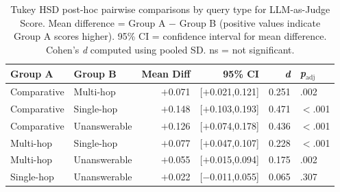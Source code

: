 \begin{table}[h]
\centering
\caption{Tukey HSD post-hoc pairwise comparisons by query type for LLM-as-Judge Score. Mean difference = Group A $-$ Group B (positive values indicate Group A scores higher). 95\% CI = confidence interval for mean difference. Cohen's \textit{d} computed using pooled SD. ns = not significant.}
\label{tab:tukey_querytype}
\begin{tabular}{llrrrl}
\toprule
\textbf{Group A} & \textbf{Group B} & \textbf{Mean Diff} & \textbf{95\% CI} & \textbf{\textit{d}} & \textbf{\textit{p}$_{\text{adj}}$} \\
\midrule
Comparative & Multi-hop    & $+$0.071 & [$+$0.021,\hphantom{$+$}0.121] & 0.251 & .002 \\
Comparative & Single-hop   & $+$0.148 & [$+$0.103,\hphantom{$+$}0.193] & 0.471 & $<$.001 \\
Comparative & Unanswerable & $+$0.126 & [$+$0.074,\hphantom{$+$}0.178] & 0.436 & $<$.001 \\
Multi-hop   & Single-hop   & $+$0.077 & [$+$0.047,\hphantom{$+$}0.107] & 0.228 & $<$.001 \\
Multi-hop   & Unanswerable & $+$0.055 & [$+$0.015,\hphantom{$+$}0.094] & 0.175 & .002 \\
Single-hop  & Unanswerable & $+$0.022 & [$-$0.011,\hphantom{$+$}0.055] & 0.065 & .307 \\
\bottomrule
\end{tabular}
\end{table}
